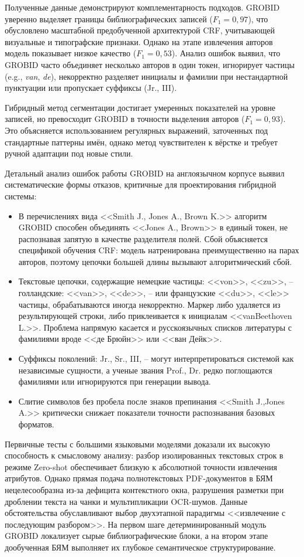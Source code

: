Полученные данные демонстрируют комплементарность подходов. GROBID уверенно выделяет границы библиографических записей ($F_1 = 0{,}97$), что обусловлено масштабной предобученной архитектурой CRF, учитывающей визуальные и типографские признаки. Однако на этапе извлечения авторов модель показывает низкое качество ($F_1 = 0{,}53$). Анализ ошибок выявил, что GROBID часто объединяет несколько авторов в один токен, игнорирует частицы (e.g., \textit{van}, \textit{de}), некорректно разделяет инициалы и фамилии при нестандартной пунктуации или пропускает суффиксы (Jr., III).

Гибридный метод сегментации достигает умеренных показателей на уровне записей, но превосходит GROBID в точности выделения авторов ($F_1 = 0{,}93$). Это объясняется использованием регулярных выражений, заточенных под стандартные паттерны имён, однако метод чувствителен к вёрстке и требует ручной адаптации под новые стили.

Детальный анализ ошибок работы GROBID на англоязычном корпусе выявил систематические формы отказов, критичные для проектирования гибридной системы:
\begin{itemize}
    \item В перечислениях вида <<Smith J., Jones A., Brown K.>> алгоритм GROBID способен объединять <<Jones A., Brown>> в единый токен, не распознавая запятую в качестве разделителя полей. Сбой объясняется спецификой обучения CRF: модель натренирована преимущественно на парах авторов, поэтому цепочки большей длины вызывают алгоритмический сбой.
    \item Текстовые цепочки, содержащие немецкие частицы: <<von>>, <<zu>>, -- голландские: <<van>>, <<de>>, -- или французские <<du>>, <<le>> частицы, обрабатываются иногда некорректно. Маркер либо удаляется из результирующей строки, либо приклеивается к инициалам <<vanBeethoven L.>>. Проблема напрямую касается и русскоязычных списков литературы с фамилиями вроде <<де Брюйн>> или <<ван Дейк>>.
    \item Суффиксы поколений: Jr., Sr., III, -- могут интерпретироваться системой как независимые сущности, а ученые звания Prof., Dr. редко поглощаются фамилиями или игнорируются при генерации вывода.
    \item Слитие символов без пробела после знаков препинания <<Smith J.,Jones A.>> критически снижает показатели точности распознавания базовых форматов.
\end{itemize}

Первичные тесты с большими языковыми моделями доказали их высокую способность к смысловому анализу: разбор изолированных текстовых строк в режиме Zero-shot обеспечивает близкую к абсолютной точности извлечения атрибутов. Однако прямая подача полнотекстовых PDF-документов в БЯМ нецелесообразна из-за дефицита контекстного окна, разрушения разметки при дроблении текста на чанки и мультипликации OCR-шумов. Данные обстоятельства обуславливают выбор двухэтапной парадигмы <<извлечение с последующим разбором>>. На первом шаге детерминированный модуль GROBID локализует сырые библиографические блоки, а на втором этапе дообученная БЯМ выполняет их глубокое семантическое структурирование.

